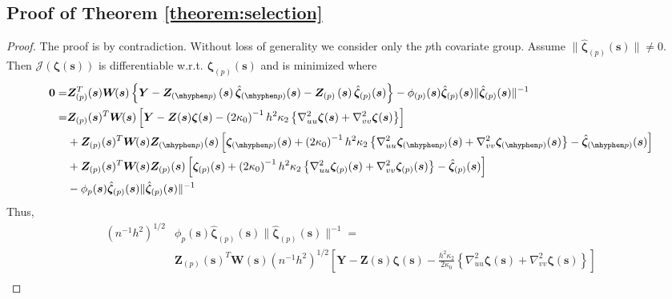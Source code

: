 \documentclass[authoryear,review, 12pt]{elsarticle}
\begin{document}
\subsection*{Proof of Theorem \ref{theorem:selection}\label{sec:gaussian-selection-proof}}
\begin{proof}
The proof is by contradiction. Without loss of generality we consider
only the $p$th covariate group.
Assume $\|\hat{\bm{\zeta}}_{(p)}(\bm{s})\|\ne0$. Then $\mathcal{J}\left(\bm{\zeta}(\bm{s})\right)$
is differentiable w.r.t. $\bm{\zeta}_{(p)}(\bm{s})$ and is minimized
where 
\begin{align*}
\bm{0}= & \bm{Z}_{(p)}^{T}(\bm{s})\bm{W}\!(\bm{s})\left\{ \bm{Y}-\bm{Z}_{(\mhyphen p)}\left(\bm{s}\right)\hat{\bm{\zeta}}_{(\mhyphen p)}(\bm{s})-\bm{Z}_{(p)}\left(\bm{s}\right)\hat{\bm{\zeta}}_{(p)}(\bm{s})\right\} -\phi_{(p)}(\bm{s})\hat{\bm{\zeta}}_{(p)}(\bm{s})\|\hat{\bm{\zeta}}_{(p)}(\bm{s})\|^{-1}\\
= & \bm{Z}_{(p)}(\bm{s})^{T}\bm{W}\!(\bm{s})\left[\bm{Y}-\bm{Z}(\bm{s})\bm{\zeta}(\bm{s})-\left(2\kappa_{0}\right)^{-1}h^{2}\kappa_{2}\left\{ \nabla_{uu}^{2}\bm{\zeta}(\bm{s})+\nabla_{vv}^{2}\bm{\zeta}(\bm{s})\right\} \right]\\
 & +\bm{Z}_{(p)}(\bm{s})^{T}\bm{W}\!(\bm{s})\bm{Z}_{(\mhyphen p)}(\bm{s})\left[\bm{\zeta}_{(\mhyphen p)}(\bm{s})+\left(2\kappa_{0}\right)^{-1}h^{2}\kappa_{2}\left\{ \nabla_{uu}^{2}\bm{\zeta}_{(\mhyphen p)}(\bm{s})+\nabla_{vv}^{2}\bm{\zeta}_{(\mhyphen p)}(\bm{s})\right\} -\hat{\bm{\zeta}}_{(\mhyphen p)}(\bm{s})\right]\\
 & +\bm{Z}_{(p)}(\bm{s})^{T}\bm{W}\!(\bm{s})\bm{Z}_{(p)}(\bm{s})\left[\bm{\zeta}_{(p)}(\bm{s})+\left(2\kappa_{0}\right)^{-1}h^{2}\kappa_{2}\left\{ \nabla_{uu}^{2}\bm{\zeta}_{(p)}(\bm{s})+\nabla_{vv}^{2}\bm{\zeta}_{(p)}(\bm{s})\right\} -\hat{\bm{\zeta}}_{(p)}(\bm{s})\right]\\
 & -\phi_{p}(\bm{s})\hat{\bm{\zeta}}_{(p)}(\bm{s})\|\hat{\bm{\zeta}}_{(p)}(\bm{s})\|^{-1}
\end{align*}
Thus,
\begin{align}
\left(n^{-1}h^{2}\right)^{1/2} & \phi_{p}(\bm{s})\hat{\bm{\zeta}}_{(p)}(\bm{s})\|\hat{\bm{\zeta}}_{(p)}(\bm{s})\|^{-1}=\nonumber \\
 & \bm{Z}_{(p)}(\bm{s})^{T}\bm{W}\!(\bm{s})\left(n^{-1}h^{2}\right)^{1/2}\left[\bm{Y}-\bm{Z}(\bm{s})\bm{\zeta}(\bm{s})-\frac{h^{2}\kappa_{2}}{2\kappa_{0}}\left\{ \nabla_{uu}^{2}\bm{\zeta}(\bm{s})+\nabla_{vv}^{2}\bm{\zeta}(\bm{s})\right\} \right]\nonumber \\

\end{align}
\end{proof}
\end{document}
